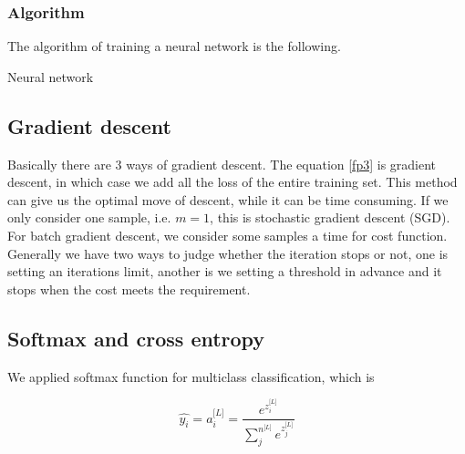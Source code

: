 \documentclass[11pt]{scrartcl} %
\begin{document}
\subsubsection{Algorithm}
The algorithm of training a neural network is the following.
\begin{algorithm}
	\caption{Neural network}
	\label{alg:A}
	\begin{algorithmic}
	\end{algorithmic}
\end{algorithm}

\subsection{Gradient descent}

Basically there are 3 ways of gradient descent. The equation \eqref{fp3} is gradient descent, in which case we add all the loss of the entire training set. This method can give us the optimal move of descent, while it can be time consuming. If we only consider one sample, i.e. $m=1$, this is stochastic gradient descent (SGD). For batch gradient descent, we consider some samples a time for cost function. Generally we have two ways to judge whether the iteration stops or not, one is setting an iterations limit, another is we setting a threshold in advance and it stops when the cost meets the requirement.

\subsection{Softmax and cross entropy}

We applied softmax function for multiclass classification, which is 

\begin{equation}
\widehat{y_i}=a_i^{\lbrack L\rbrack}=\frac{e^{z_i^{\lbrack L\rbrack}}}{{\displaystyle\sum_j^{n^{\lbrack L\rbrack}}}e^{z_j^{\lbrack L\rbrack}}}
\end{equation}
\end{document}

